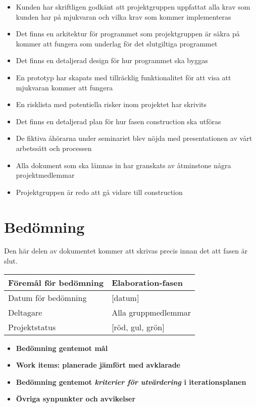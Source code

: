 \begin{itemize}
	\item Kunden har skriftligen godkänt att projektgruppen uppfattat alla krav som kunden har på mjukvaran och vilka krav som kommer implementeras 
	\item Det finns en arkitektur för programmet som projektgruppen är säkra på kommer att fungera som underlag för det slutgiltiga programmet
	\item Det finns en detaljerad design för hur programmet ska byggas
	\item En prototyp har skapats med tillräcklig funktionalitet för att visa att mjukvaran kommer att fungera
	\item En risklista med potentiella risker inom projektet har skrivits
	\item Det finns en detaljerad plan för hur fasen construction ska utföras
	\item De fiktiva åhörarna under seminariet blev nöjda med presentationen av vårt arbetssätt och processen
	\item Alla dokument som ska lämnas in har granskats av åtminstone några projektmedlemmar
	\item Projektgruppen är redo att gå vidare till construction
\end{itemize}

\section{Bedömning}
Den här delen av dokumentet kommer att skrivas precis innan det att fasen är slut.

\begin{center}
	\begin{tabular}{| l | l |}
		\hline Föremål för bedömning & Elaboration-fasen \\
		\hline Datum för bedömning & [datum] \\
		\hline Deltagare & Alla gruppmedlemmar \\
		\hline Projektstatus & [röd, gul, grön] \\
		\hline
	\end{tabular}
\end{center}

\begin{itemize}
	\item \textbf{Bedömning gentemot mål}
	\item \textbf{Work items: planerade jämfört med avklarade}
	\item \textbf{Bedömning gentemot \textit{kriterier för utvärdering} i iterationsplanen}	
	\item \textbf{Övriga synpunkter och avvikelser}
\end{itemize}



